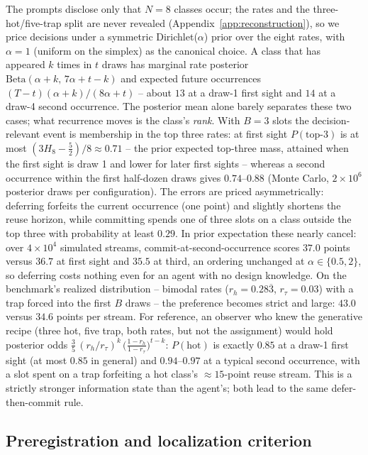 \documentclass{article}
\begin{document}
The prompts disclose only that $N=8$ classes occur; the rates and the three-hot/five-trap split are never revealed (Appendix~\ref{app:reconstruction}), so we price decisions under a symmetric Dirichlet($\alpha$) prior over the eight rates, with $\alpha=1$ (uniform on the simplex) as the canonical choice. A class that has appeared $k$ times in $t$ draws has marginal rate posterior $\mathrm{Beta}(\alpha+k,\,7\alpha+t-k)$ and expected future occurrences $(T-t)(\alpha+k)/(8\alpha+t)$ -- about $13$ at a draw-1 first sight and $14$ at a draw-4 second occurrence. The posterior mean alone barely separates these two cases; what recurrence moves is the class's \emph{rank}. With $B=3$ slots the decision-relevant event is membership in the top three rates: at first sight $P(\text{top-}3)$ is at most $(3H_8-\tfrac{5}{2})/8\approx 0.71$ -- the prior expected top-three mass, attained when the first sight is draw 1 and lower for later first sights -- whereas a second occurrence within the first half-dozen draws gives $0.74$--$0.88$ (Monte Carlo, $2{\times}10^{6}$ posterior draws per configuration). The errors are priced asymmetrically: deferring forfeits the current occurrence (one point) and slightly shortens the reuse horizon, while committing spends one of three slots on a class outside the top three with probability at least $0.29$. In prior expectation these nearly cancel: over $4{\times}10^{4}$ simulated streams, commit-at-second-occurrence scores $37.0$ points versus $36.7$ at first sight and $35.5$ at third, an ordering unchanged at $\alpha\in\{0.5,2\}$, so deferring costs nothing even for an agent with no design knowledge. On the benchmark's realized distribution -- bimodal rates ($r_h = 0.28\overline{3}$, $r_\tau = 0.03$) with a trap forced into the first $B$ draws -- the preference becomes strict and large: $43.0$ versus $34.6$ points per stream. For reference, an observer who knew the generative recipe (three hot, five trap, both rates, but not the assignment) would hold posterior odds $\tfrac{3}{5}\,(r_h/r_\tau)^{k}\,\big(\tfrac{1-r_h}{1-r_\tau}\big)^{t-k}$: $P(\text{hot})$ is exactly $0.85$ at a draw-1 first sight (at most $0.85$ in general) and $0.94$--$0.97$ at a typical second occurrence, with a slot spent on a trap forfeiting a hot class's ${\approx}15$-point reuse stream. This is a strictly stronger information state than the agent's; both lead to the same defer-then-commit rule.

\subsection{Preregistration and localization criterion} \label{app:prereg}
\end{document}
